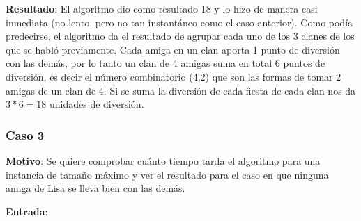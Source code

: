 \textbf{Resultado}: El algoritmo dio como resultado 18 y lo hizo de manera casi inmediata (no lento, pero no
 tan instantáneo como el caso anterior). Como podía predecirse, el algoritmo da el resultado de agrupar 
 cada uno de los 3 clanes de los que se habló previamente. Cada amiga en un clan aporta 1 punto de diversión 
 con las demás, por lo tanto un clan de 4 amigas suma en total 6 puntos de diversión, es decir el número 
 combinatorio (4,2) que son las formas de tomar 2 amigas de un clan de 4. Si se suma la diversión de cada fiesta
 de cada clan nos da $3 * 6 = 18$ unidades de diversión.

\subsubsection*{Caso 3}

\textbf{Motivo}: Se quiere comprobar cuánto tiempo tarda el algoritmo para una instancia de tamaño máximo y ver el resultado para el caso en que ninguna amiga de Lisa se lleva bien con las demás.

\textbf{Entrada}:

